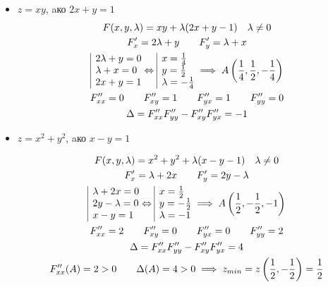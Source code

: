 \documentclass[a4paper,fleqn,12pt]{article}
\theoremstyle{definition}
\begin{document}
\begin{itemize}
\item $z = xy$, aко $2x+y=1$
\begin{gather*}
F(x,y,\lambda)   = xy + \lambda(2x+y-1) \quad \lambda \neq 0\\
F'_x = 2\lambda +y \qquad F'_y = \lambda + x \\
\begin{array}{|l@{}}
2\lambda +y= 0 \\
\lambda + x = 0\\
2x+y=1 
\end{array}\Leftrightarrow 
\begin{array}{|l@{}}
x = \frac{1}{4} \\
y = \frac{1}{2} \\
\lambda = -\frac{1}{4}
\end{array} \implies 
A \left( \frac{1}{4}, \frac{1}{2}, -\frac{1}{4}\right) \\
F''_{xx} = 0 \qquad F''_{xy} = 1 \qquad F''_{yx} = 1 \qquad F''_{yy} = 0\\
\Delta =  F''_{xx}F''_{yy} - F''_{xy}F''_{yx} = -1
\end{gather*}

\item $z = x^2 + y^2$, aко $x - y =1$

\begin{gather*}
F(x,y,\lambda)  = x^2 + y^2 + \lambda(x-y-1)  \quad \lambda \neq 0 \\
F'_x = \lambda + 2x \qquad F'_y = 2y - \lambda \\
\begin{array}{|l@{}}
\lambda + 2x = 0\\
2y - \lambda = 0\\
x-y = 1
\end{array}\Leftrightarrow 
\begin{array}{|l@{}}
x = \frac{1}{2} \\
y = -\frac{1}{2} \\
\lambda = -1
\end{array}
\implies 
A \left( \frac{1}{2}, -\frac{1}{2}, -1\right) \\
F''_{xx} = 2 \qquad F''_{xy} = 0 \qquad F''_{yx} = 0 \qquad F''_{yy} = 2\\
\Delta =  F''_{xx}F''_{yy} - F''_{xy}F''_{yx} = 4 \\
F''_{xx}(A) = 2>0 \qquad \Delta(A) = 4 >0 \implies z_{min} = z \left( \frac{1}{2}, -\frac{1}{2}\right) = \frac{1}{2}
\end{gather*}


\end{itemize}
\end{document}
